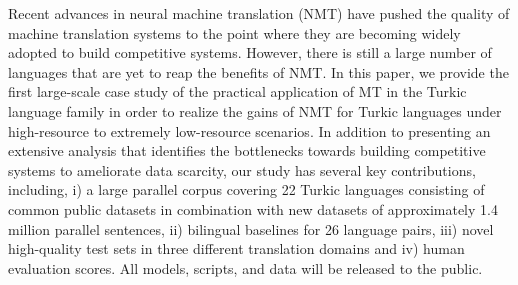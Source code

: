 Recent advances in neural machine translation (NMT) have pushed the quality of machine translation systems to the point where they are becoming widely adopted to build competitive systems. However, there is still a large number of languages that are yet to reap the benefits of NMT. In this paper, we provide the first large-scale case study of the practical application of MT in the Turkic language family in order to realize the gains of NMT for Turkic languages under high-resource to extremely low-resource scenarios. In addition to presenting an extensive analysis that identifies the bottlenecks towards building competitive systems to ameliorate data scarcity, our study has several key contributions, including, i) a large parallel corpus covering 22 Turkic languages consisting of common public datasets in combination with new datasets of approximately 1.4 million parallel sentences, ii) bilingual baselines for 26 language pairs, iii) novel high-quality test sets in three different translation domains and iv) human evaluation scores. All models, scripts, and data will be released to the public.
